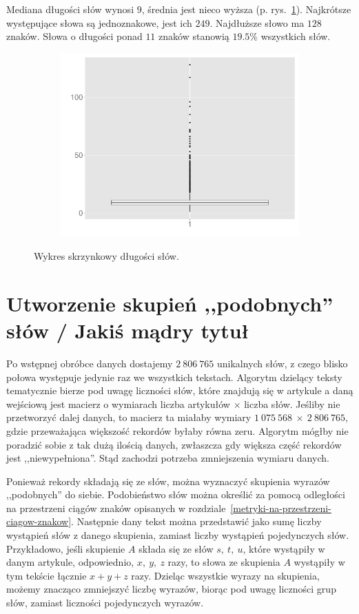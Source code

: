 \documentclass{praca1}
\begin{document}
Mediana długości słów wynosi $9$, średnia jest nieco wyższa (p. rys.~\ref{plot:003}). Najkrótsze występujące słowa są jednoznakowe, jest ich $249$. Najdłuższe słowo ma $128$ znaków. Słowa o długości ponad $11$ znaków stanowią $19.5\%$ wszystkich słów.

\begin{figure}[!h]
  \centering
  \includegraphics[width=350pt, height=200pt]{plot3.pdf}\\
  \caption{Wykres skrzynkowy długości słów.}\label{plot:003}
\end{figure}


\section{Utworzenie skupień ,,podobnych'' słów / Jakiś mądry tytuł}

Po wstępnej obróbce danych dostajemy $2\ 806\ 765$ unikalnych słów, z czego blisko połowa występuje jedynie raz we wszystkich tekstach. Algorytm dzielący teksty tematycznie bierze pod uwagę liczności słów, które znajdują się w artykule a daną wejściową jest macierz o wymiarach liczba artykułów $\times$ liczba słów. Jeśliby nie przetworzyć dalej danych, to macierz ta miałaby wymiary $1\ 075\ 568\ \times\ 2\ 806\ 765$, gdzie przeważająca większość rekordów byłaby równa zeru. Algorytm mógłby nie poradzić sobie z tak dużą ilością danych, zwłaszcza gdy większa część rekordów jest ,,niewypełniona''. Stąd zachodzi potrzeba zmniejszenia wymiaru danych. 

Ponieważ rekordy składają się ze słów, można wyznaczyć skupienia wyrazów ,,podobnych'' do siebie. Podobieństwo słów można określić za pomocą odległości na przestrzeni ciągów znaków opisanych w rozdziale~\ref{metryki-na-przestrzeni-ciagow-znakow}. Następnie dany tekst można przedstawić jako sumę liczby wystąpień słów z danego skupienia, zamiast liczby wystąpień pojedynczych słów. Przykładowo, jeśli skupienie $A$ składa się ze słów $s,\ t,\ u$, które wystąpiły w danym artykule, odpowiednio, $x,\ y,\ z$ razy, to słowa ze skupienia $A$ wystąpiły w tym tekście łącznie $x+y+z$ razy. Dzieląc wszystkie wyrazy na skupienia, możemy znacząco zmniejszyć liczbę wyrazów, biorąc pod uwagę liczności grup słów, zamiast liczności pojedynczych wyrazów.
\end{document}
